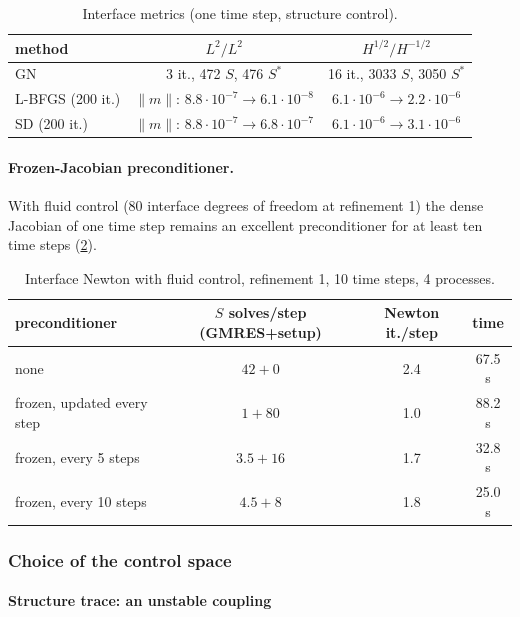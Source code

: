\documentclass[11pt,a4paper]{article}
\theoremstyle{definition}
\theoremstyle{remark}
\begin{document}
\begin{table}[ht]\centering
\caption{Interface metrics (one time step, structure control).}\label{tab:metrics}
\begin{tabular}{lcc}
\toprule
method & $L^2/L^2$ & $H^{1/2}/H^{-1/2}$\\
\midrule
GN & 3 it., 472 $S$, 476 $S^*$ & 16 it., 3033 $S$, 3050 $S^*$\\
L-BFGS (200 it.) & $\|m\|$: $8.8\cdot10^{-7}\to6.1\cdot10^{-8}$ & $6.1\cdot10^{-6}\to2.2\cdot10^{-6}$\\
SD (200 it.) & $\|m\|$: $8.8\cdot10^{-7}\to6.8\cdot10^{-7}$ & $6.1\cdot10^{-6}\to3.1\cdot10^{-6}$\\
\bottomrule
\end{tabular}
\end{table}

\paragraph{Frozen-Jacobian preconditioner.} With fluid control (80 interface degrees of freedom at
refinement 1) the dense Jacobian of one time step remains an excellent preconditioner for at least
ten time steps (\cref{tab:frozen}).

\begin{table}[ht]\centering
\caption{Interface Newton with fluid control, refinement 1, 10 time steps, 4 processes.}
\label{tab:frozen}
\begin{tabular}{lccc}
\toprule
preconditioner & $S$ solves/step (GMRES+setup) & Newton it./step & time\\
\midrule
none & $42+0$ & 2.4 & 67.5 s\\
frozen, updated every step & $1+80$ & 1.0 & 88.2 s\\
frozen, every 5 steps & $3.5+16$ & 1.7 & 32.8 s\\
frozen, every 10 steps & $4.5+8$ & 1.8 & 25.0 s\\
\bottomrule
\end{tabular}
\end{table}

\subsubsection{Choice of the control space}\label{sec:spaces}

\paragraph{Structure trace: an unstable coupling}
\end{document}
